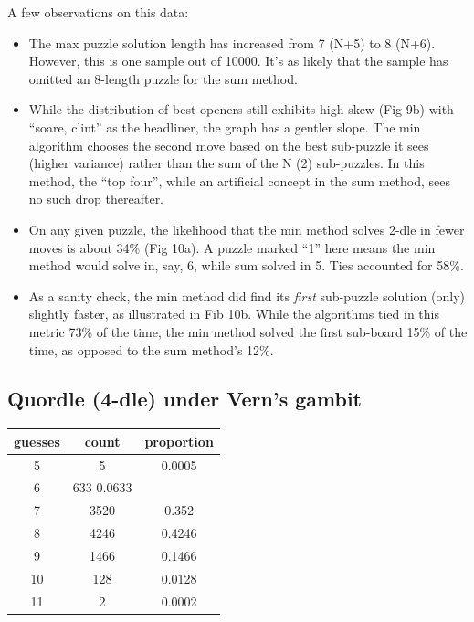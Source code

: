 \documentclass[11pt, oneside]{article} 	%
\begin{document}
A few observations on this data:
\begin{itemize}
\item The max puzzle solution length has increased from 7 (N+5) to 8 (N+6). However, this is one sample out of 10000.  It's as likely that the sample has omitted an 8-length puzzle for the sum method.
\item While the distribution of best openers still exhibits high skew (Fig 9b) with ``soare, clint'' as the headliner, the graph has a gentler slope. The min algorithm chooses the second move based on the best sub-puzzle it sees (higher variance) rather than the sum of the N (2) sub-puzzles.  In this method, the ``top four'', while an artificial concept in the sum method, sees no such drop thereafter.
\item On any given puzzle, the likelihood that the min method solves 2-dle in fewer moves is about 34\% (Fig 10a). A puzzle marked ``1'' here means the min method would solve in, say, 6, while sum solved in 5.  Ties accounted for 58\%. 
\item As a sanity check, the min method did find its \emph{first} sub-puzzle solution (only) slightly faster, as illustrated in Fib 10b. While the algorithms tied in this metric 73\% of the time, the min method solved the first sub-board 15\% of the time, as opposed to the sum method's 12\%.
\end{itemize}




\subsection{Quordle (4-dle) under Vern's gambit}

\begin{center}
\begin{tabular}{ |c|c|c| }
 \hline
guesses & count & proportion \\
 \hline
5 & 5	 & 0.0005 \\
6 & 633	0.0633 \\
7 & 3520 & 0.352 \\ 
8 & 4246 & 0.4246 \\ 
9 & 1466 & 0.1466 \\ 
10 & 128 & 0.0128 \\ 
11 & 2 & 0.0002 \\
 \hline
\end{tabular}
\end{center}
\end{document}
